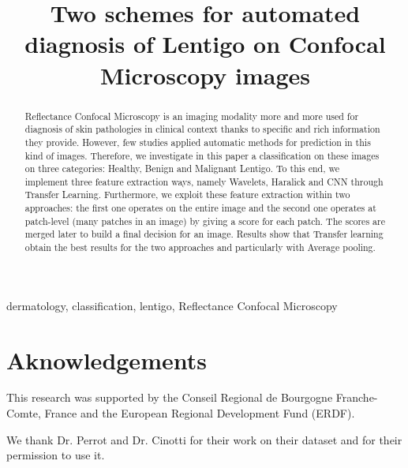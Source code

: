 \documentclass[10pt, conference, compsocconf]{IEEEtran}
\begin{document}
\title{Two schemes for automated diagnosis of Lentigo on Confocal Microscopy images}

\author{
        \and
        }
        

\maketitle

\begin{abstract}
    Reflectance Confocal Microscopy is an imaging modality more and more used for diagnosis of skin pathologies in clinical context thanks to specific and rich information they provide. However, few studies applied automatic methods for prediction in this kind of images. Therefore, we investigate in this paper a classification on these images on three categories: Healthy, Benign and Malignant Lentigo. To this end, we implement three feature extraction ways, namely Wavelets, Haralick and CNN through Transfer Learning. Furthermore, we exploit these feature extraction within two approaches: the first one operates on the entire image and the second one operates at patch-level (many patches in an image) by giving a score for each patch. The scores are merged later to build a final decision for an image. Results show that Transfer learning obtain the best results for the two approaches and particularly with Average pooling. 
\end{abstract}

\begin{IEEEkeywords}
    dermatology, classification, lentigo, Reflectance Confocal Microscopy
\end{IEEEkeywords}

\IEEEpeerreviewmaketitle






\section*{Aknowledgements}
This research was supported by the Conseil Regional de Bourgogne Franche-Comte, France and the European Regional Development Fund (ERDF).\par
We thank Dr. Perrot and Dr. Cinotti for their work on their dataset and for their permission to use it.\par

{\small
\printbibliography
}

\end{document}
